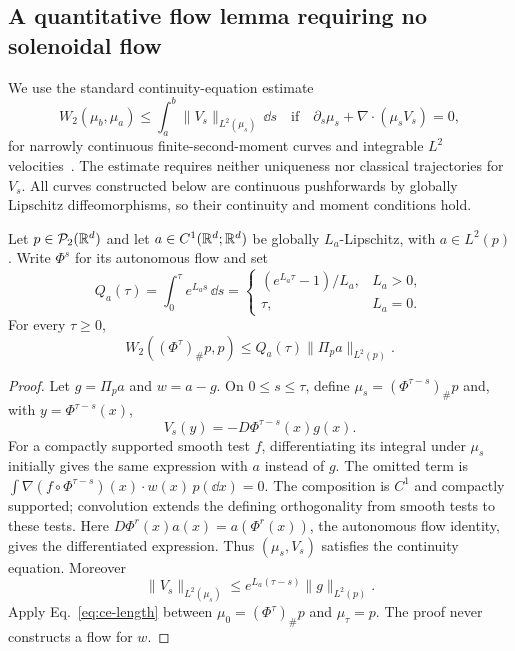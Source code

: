 \subsection{A quantitative flow lemma requiring no solenoidal flow}

We use the standard continuity-equation estimate
\begin{equation}
 W_2(\mu_b,\mu_a)\le\int_a^b\|V_s\|_{L^2(\mu_s)}\,\dd s
 \quad\text{if}\quad
 \partial_s\mu_s+\nabla\cdot(\mu_sV_s)=0,
 \label{eq:ce-length}
\end{equation}
for narrowly continuous finite-second-moment curves and integrable
$L^2$ velocities~\citep[Theorem~8.3.1]{ambrosio2005gradient}.  The
estimate requires neither uniqueness nor classical trajectories for
$V_s$.  All curves constructed below are continuous pushforwards by
globally Lipschitz diffeomorphisms, so their continuity and moment
conditions hold.

\begin{lemma}
\label{lem:projected-frozen-flow}
Let $p\in\mathcal P_2(\mathbb R^d)$ and let $a\in C^1(\mathbb R^d;\mathbb R^d)$ be globally
$L_a$-Lipschitz, with $a\in L^2(p)$.  Write $\Phi^s$ for its autonomous
flow and set
\[
 Q_a(\tau)=\int_0^\tau e^{L_as}\,\dd s
 =\begin{cases}(e^{L_a\tau}-1)/L_a,&L_a>0,\\\tau,&L_a=0.
 \end{cases}
\]
For every $\tau\ge0$,
\begin{equation}
 W_2((\Phi^\tau)_\#p,p)
 \le Q_a(\tau)\|\Pi_pa\|_{L^2(p)}.
 \label{eq:frozen-projected-bound}
\end{equation}
\end{lemma}

\begin{proof}
Let $g=\Pi_pa$ and $w=a-g$.  On $0\le s\le\tau$, define
$\mu_s=(\Phi^{\tau-s})_\#p$ and, with $y=\Phi^{\tau-s}(x)$,
\[
 V_s(y)=-D\Phi^{\tau-s}(x)g(x).
\]
For a compactly supported smooth test $f$, differentiating its integral
under $\mu_s$ initially gives the same expression with $a$ instead of
$g$.  The omitted term is
$\int \nabla(f\circ\Phi^{\tau-s})(x)\cdot w(x)\,p(\dd x)=0$.
The composition is $C^1$ and compactly supported; convolution extends
the defining orthogonality from smooth tests to these tests.  Here
$D\Phi^r(x)a(x)=a(\Phi^r(x))$, the autonomous flow identity, gives
the differentiated expression.  Thus $(\mu_s,V_s)$ satisfies the
continuity equation.  Moreover
\[
 \|V_s\|_{L^2(\mu_s)}
 \le e^{L_a(\tau-s)}\|g\|_{L^2(p)}.
\]
Apply Eq.~\eqref{eq:ce-length} between
$\mu_0=(\Phi^\tau)_\#p$ and $\mu_\tau=p$.
The proof never constructs a flow for $w$.
\end{proof}

